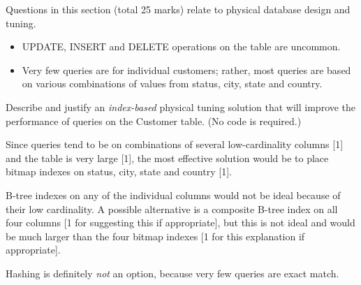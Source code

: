 \documentclass[markingschedule]{ouexam}
\begin{document}
\begin{examsection}{25}{}{Questions in this section (total 25 marks) relate to
physical database design and tuning.}
\begin{question}{10}
\begin{itemize}
		\item UPDATE, INSERT and DELETE operations on the table are uncommon.

		\item Very few queries are for individual customers; rather, most
		queries are based on various combinations of values from
		\textsf{status}, \textsf{city}, \textsf{state} and \textsf{country}.

	\end{itemize}
	\medskip


	\begin{subquestion}{3}
		Describe and justify an \emph{index-based} physical tuning solution
		that will improve the performance of queries on the \textsf{Customer}
		table. (No code is required.)
		\begin{marking}
			Since queries tend to be on combinations of several low-cardinality
			columns [1] and the table is very large [1], the most effective
			solution would be to place bitmap indexes on status, city, state
			and country [1].

			B-tree indexes on any of the individual columns would not be ideal
			because of their low cardinality. A possible alternative is a
			composite B-tree index on all four columns [1 for suggesting this
			if appropriate], but this is not ideal and would be much larger
			than the four bitmap indexes [1 for this explanation if
			appropriate].

			Hashing is definitely \emph{not} an option, because very few
			queries are exact match.
		\end{marking}
	\end{subquestion}
		


\end{question}
\end{examsection}
\end{document}
